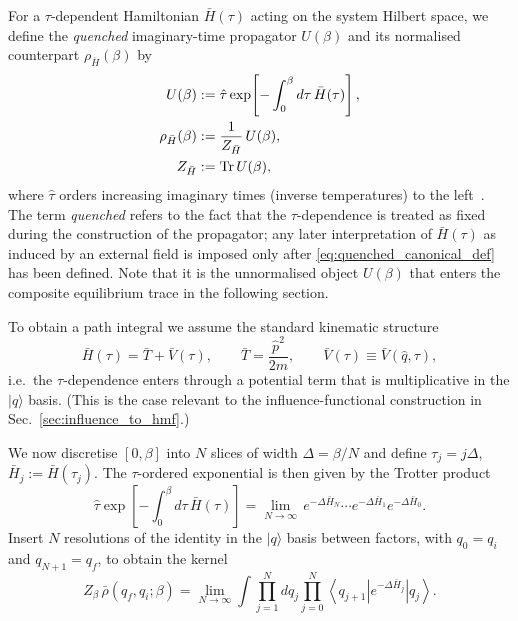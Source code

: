 For a $\tau$-dependent Hamiltonian $\bar H(\tau)$ acting on the system Hilbert
space, we define the \emph{quenched} imaginary-time propagator $U(\beta)$ and its
normalised counterpart $\rho_{\bar H}(\beta)$ by
\begin{equation}
\begin{split}
    U(\beta)
    &:=
    \hat\tau \exp\!\left[-\int_{0}^{\beta} d\tau\,\bar H(\tau)\right],
    \\
    \rho_{\bar H}(\beta)
    &:=
    \frac{1}{Z_{\bar H}}\, U(\beta),
    \\
    Z_{\bar H}&:=\mathrm{Tr}\, U(\beta),
\end{split}
    \label{eq:quenched_canonical_def}
\end{equation}
where $\hat\tau$ orders increasing imaginary times (inverse temperatures) to the left~\cite{feynmanQuantumMechanicsPath1965, kleinertPathIntegralsQuantum2009}.
The term \emph{quenched} refers to the fact that the $\tau$-dependence is treated as fixed
during the construction of the propagator; any later interpretation of $\bar H(\tau)$ as
induced by an external field is imposed only after \eqref{eq:quenched_canonical_def}
has been defined. Note that it is the unnormalised object $U(\beta)$ that enters the
composite equilibrium trace in the following section.


To obtain a path integral we assume the standard kinematic structure
\begin{equation}
    \bar H(\tau)=\bar T+\bar V(\tau),
    \qquad
    \bar T=\frac{\hat p^2}{2m},
    \qquad
    \bar V(\tau)\equiv \bar V(\hat q,\tau),
    \label{eq:quenched_T_plus_V}
\end{equation}
i.e.\ the $\tau$-dependence enters through a potential term that is multiplicative in the
$|q\rangle$ basis. (This is the case relevant to the influence-functional construction
in Sec.~\ref{sec:influence_to_hmf}.)

We now discretise $[0,\beta]$ into $N$ slices of width $\Delta=\beta/N$ and define
$\tau_j=j\Delta$, $\bar H_j:=\bar H(\tau_j)$. The $\tau$-ordered exponential is then
given by the Trotter product~\cite{kleinertPathIntegralsQuantum2009,schulmanTechniquesApplicationsPath1981}
\begin{equation}
    \hat\tau \exp\!\left[-\int_{0}^{\beta} d\tau\,\bar H(\tau)\right]
    =\lim_{N\to\infty}\, e^{-\Delta \bar H_{N}}\cdots e^{-\Delta \bar H_{1}}e^{-\Delta \bar H_{0}}.
    \label{eq:quenched_timeslice}
\end{equation}
Insert $N$ resolutions of the identity in the $|q\rangle$ basis between factors, with
$q_0=q_i$ and $q_{N+1}=q_f$, to obtain the kernel
\begin{equation}
    Z_\beta\,\bar\rho(q_f,q_i;\beta)
    =
    \lim_{N\to\infty}
    \int \prod_{j=1}^{N} dq_j
    \prod_{j=0}^{N}
    \left\langle q_{j+1}\right| e^{-\Delta \bar H_j}\left|q_j\right\rangle.
    \label{eq:quenched_kernel_product}
\end{equation}

